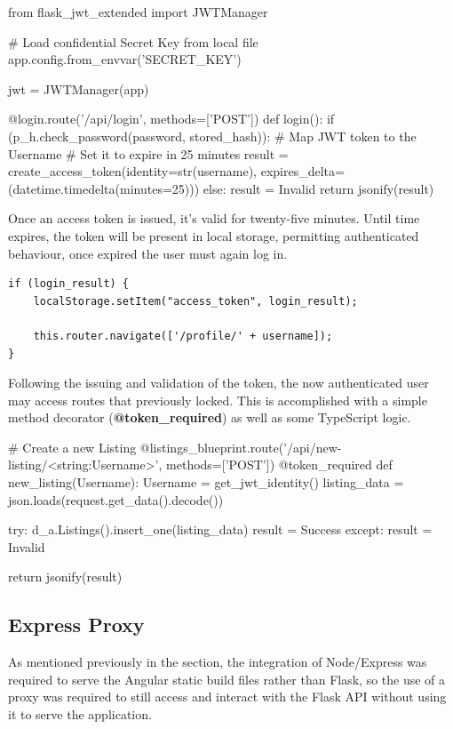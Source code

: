 \begin{python}[caption=Issuing a limited JWT Token ]
from flask_jwt_extended import JWTManager

# Load confidential Secret Key from local file
app.config.from_envvar('SECRET_KEY')

jwt = JWTManager(app)

@login.route('/api/login', methods=['POST'])
def login():
    if (p_h.check_password(password, stored_hash)): 
        # Map JWT token to the Username
        # Set it to expire in 25 minutes
        result = create_access_token(identity=str(username), expires_delta=(datetime.timedelta(minutes=25)))
    else:
        result = Invalid
    return jsonify(result)
\end{python}
      
\newpage
Once an access token is issued, it's valid for twenty-five minutes. Until time expires, the token will be present in local storage, permitting authenticated behaviour, once expired the user must again log in.

\begin{lstlisting}[caption=Storing the Authentication Token]
if (login_result) {
    localStorage.setItem("access_token", login_result);
    
    this.router.navigate(['/profile/' + username]);
}
\end{lstlisting}

Following the issuing and validation of the token, the now authenticated user may access routes that previously locked. This is accomplished with a simple method decorator (\textbf{@token\_required}) as well as some TypeScript logic. \newline

\begin{python}[caption=Issuing a limited JWT Token]
# Create a new Listing
@listings_blueprint.route('/api/new-listing/<string:Username>', methods=['POST'])
@token_required
def new_listing(Username):
    Username = get_jwt_identity()
    listing_data = json.loads(request.get_data().decode())
   
    try: 
        d_a.Listings().insert_one(listing_data) 
        result = Success
    except:
        result = Invalid
    
    return jsonify(result)
\end{python}

\subsection{Express Proxy}
As mentioned previously in the section, the integration of Node/Express was required to serve the Angular static build files rather than Flask, so the use of a proxy was required to still access and interact with the Flask API without using it to serve the application.

